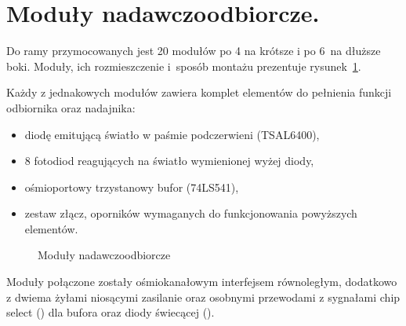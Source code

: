 \afterpage{\clearpage}

\section{Moduły nadawczo\ppauza{}odbiorcze.}

Do ramy przymocowanych jest 20 modułów \pauza po 4 na krótsze i po 6~na dłuższe boki. Moduły, ich rozmieszczenie i~sposób montażu prezentuje rysunek~\ref{fig:modules}.

Każdy z jednakowych modułów zawiera komplet elementów do pełnienia funkcji odbiornika oraz nadajnika:
\begin{itemize}
 \item diodę emitującą światło w paśmie podczerwieni (TSAL6400),
 \item 8 fotodiod reagujących na światło wymienionej wyżej diody,
 \item ośmioportowy trzystanowy bufor (74LS541),
 \item zestaw złącz, oporników wymaganych do funkcjonowania powyższych elementów.
\end{itemize}

\begin{figure}[tb]
 \centering
 \caption{Moduły nadawczo\ppauza{}odbiorcze}
 \label{fig:modules}
\end{figure}

Moduły połączone zostały ośmiokanałowym interfejsem równoległym, dodatkowo z dwiema żyłami niosącymi zasilanie oraz osobnymi przewodami z sygnałami chip select () dla bufora oraz diody świecącej ().\\

